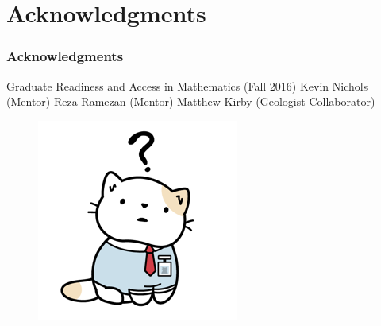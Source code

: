 \documentclass{beamer}
\begin{document}
\section{Acknowledgments}
%
%
%



\begin{frame}
\frametitle{Acknowledgments}
\footnotesize{
\begin{thebibliography}{99} %
 Graduate Readiness and Access in Mathematics (Fall 2016)
 Kevin Nichols  (Mentor)
 Reza Ramezan (Mentor)
 Matthew Kirby (Geologist Collaborator)
\end{thebibliography}
}
\end{frame}

\begin{frame}
\begin{figure}
\begin{center}
\includegraphics[width=.7\textwidth]{pic1.png}
\end{center}
\end{figure}
\end{frame}
\end{document}
